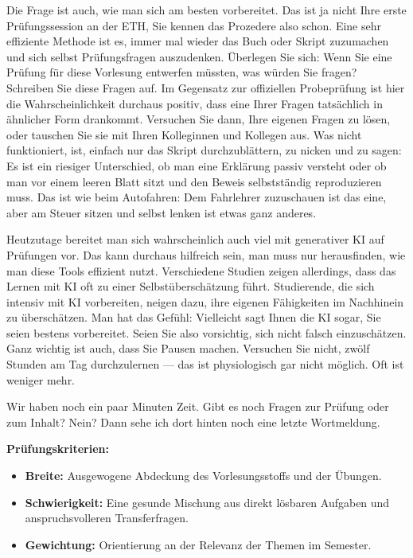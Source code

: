 \begin{spoken-clean}[01:26:29 - 01:26:54]
Die Frage ist auch, wie man sich am besten vorbereitet. Das ist ja nicht Ihre erste Prüfungssession an der ETH, Sie kennen das Prozedere also schon. Eine sehr effiziente Methode ist es, immer mal wieder das Buch oder Skript zuzumachen und sich selbst Prüfungsfragen auszudenken. Überlegen Sie sich: Wenn Sie eine Prüfung für diese Vorlesung entwerfen müssten, was würden Sie fragen? Schreiben Sie diese Fragen auf. Im Gegensatz zur offiziellen Probeprüfung ist hier die Wahrscheinlichkeit durchaus positiv, dass eine Ihrer Fragen tatsächlich in ähnlicher Form drankommt. Versuchen Sie dann, Ihre eigenen Fragen zu lösen, oder tauschen Sie sie mit Ihren Kolleginnen und Kollegen aus. Was nicht funktioniert, ist, einfach nur das Skript durchzublättern, zu nicken und zu sagen:  Es ist ein riesiger Unterschied, ob man eine Erklärung passiv versteht oder ob man vor einem leeren Blatt sitzt und den Beweis selbstständig reproduzieren muss. Das ist wie beim Autofahren: Dem Fahrlehrer zuzuschauen ist das eine, aber am Steuer sitzen und selbst lenken ist etwas ganz anderes.

Heutzutage bereitet man sich wahrscheinlich auch viel mit generativer KI auf Prüfungen vor. Das kann durchaus hilfreich sein, man muss nur herausfinden, wie man diese Tools effizient nutzt. Verschiedene Studien zeigen allerdings, dass das Lernen mit KI oft zu einer Selbstüberschätzung führt. Studierende, die sich intensiv mit KI vorbereiten, neigen dazu, ihre eigenen Fähigkeiten im Nachhinein zu überschätzen. Man hat das Gefühl:  Vielleicht sagt Ihnen die KI sogar, Sie seien bestens vorbereitet. Seien Sie also vorsichtig, sich nicht falsch einzuschätzen. Ganz wichtig ist auch, dass Sie Pausen machen. Versuchen Sie nicht, zwölf Stunden am Tag durchzulernen --- das ist physiologisch gar nicht möglich. Oft ist weniger mehr.

Wir haben noch ein paar Minuten Zeit. Gibt es noch Fragen zur Prüfung oder zum Inhalt? Nein? Dann sehe ich dort hinten noch eine letzte Wortmeldung.
\end{spoken-clean}

\begin{math-stroke}
\textbf{Prüfungskriterien:}
\begin{itemize}
    \item \textbf{Breite:} Ausgewogene Abdeckung des Vorlesungsstoffs und der Übungen.
    \item \textbf{Schwierigkeit:} Eine gesunde Mischung aus direkt lösbaren Aufgaben und anspruchsvolleren Transferfragen.
    \item \textbf{Gewichtung:} Orientierung an der Relevanz der Themen im Semester.
\end{itemize}
\end{math-stroke}

